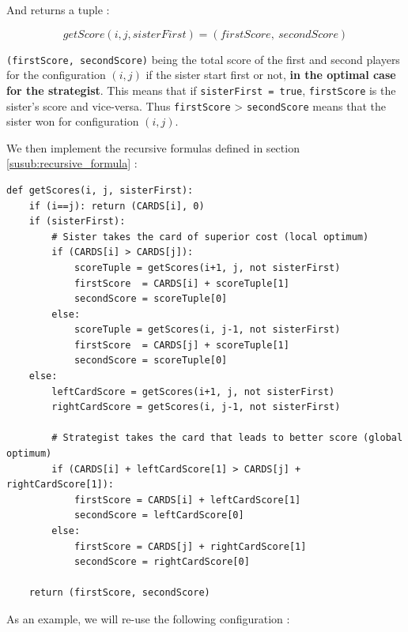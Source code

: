 \documentclass[a4paper,12pt,fleqn]{article}
\begin{document}
And returns a tuple :

$$getScore(i, j, sisterFirst) = (firstScore,\ secondScore)$$

\noindent \texttt{(firstScore, secondScore)} being the total score of the first and second players for the configuration $(i,j)$ if the sister start first or not, \textbf{in the optimal case for the strategist}.
This means that if \texttt{sisterFirst = true}, \texttt{firstScore} is the sister's score and vice-versa.
Thus \texttt{firstScore} > \texttt{secondScore} means that the sister won for configuration $(i,j)$.

We then implement the recursive formulas defined in section \ref{susub:recursive_formula} :

\begin{verbatim}
def getScores(i, j, sisterFirst):
    if (i==j): return (CARDS[i], 0)
    if (sisterFirst):
        # Sister takes the card of superior cost (local optimum)
        if (CARDS[i] > CARDS[j]):
            scoreTuple = getScores(i+1, j, not sisterFirst)
            firstScore  = CARDS[i] + scoreTuple[1]
            secondScore = scoreTuple[0]
        else:
            scoreTuple = getScores(i, j-1, not sisterFirst)
            firstScore  = CARDS[j] + scoreTuple[1]
            secondScore = scoreTuple[0]
    else:
        leftCardScore = getScores(i+1, j, not sisterFirst)
        rightCardScore = getScores(i, j-1, not sisterFirst)

        # Strategist takes the card that leads to better score (global optimum)
        if (CARDS[i] + leftCardScore[1] > CARDS[j] + rightCardScore[1]):
            firstScore = CARDS[i] + leftCardScore[1]
            secondScore = leftCardScore[0]
        else:
            firstScore = CARDS[j] + rightCardScore[1]
            secondScore = rightCardScore[0]
    
    return (firstScore, secondScore)
\end{verbatim}

As an example, we will re-use the following configuration :
\end{document}

